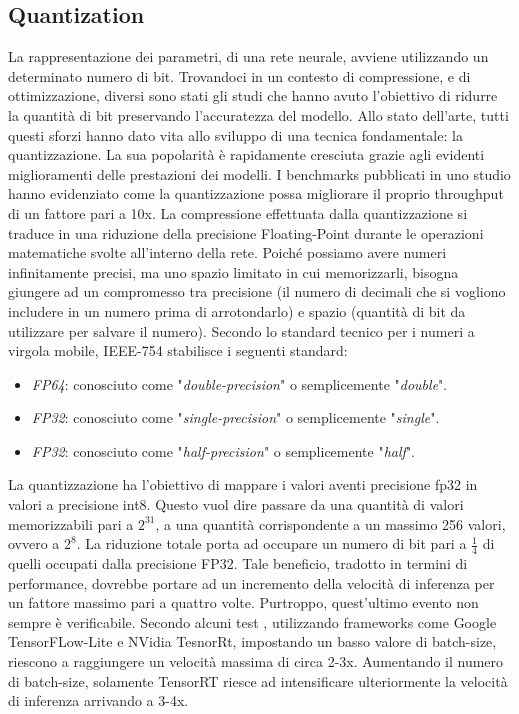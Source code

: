 \subsection{Quantization}
La rappresentazione dei parametri, di una rete neurale, avviene utilizzando un determinato numero di bit. Trovandoci in un contesto di compressione, e di ottimizzazione, diversi sono stati gli studi che hanno avuto l'obiettivo di ridurre la quantità di bit preservando l'accuratezza del modello. Allo stato dell'arte, tutti questi sforzi hanno dato vita allo sviluppo di una tecnica fondamentale: la quantizzazione. La sua popolarità è rapidamente cresciuta grazie agli evidenti miglioramenti delle prestazioni dei modelli. I benchmarks pubblicati in uno studio \cite{quantization_speed} hanno evidenziato come la quantizzazione possa migliorare il proprio throughput di un fattore pari a 10x.
La compressione effettuata dalla quantizzazione si traduce in una riduzione della precisione Floating-Point durante le operazioni matematiche svolte all'interno della rete. 
Poiché possiamo avere numeri infinitamente precisi, ma uno spazio limitato in cui memorizzarli, bisogna giungere ad un compromesso tra precisione (il numero di decimali che si vogliono includere in un numero prima di arrotondarlo) e spazio (quantità di bit da utilizzare per salvare il numero). Secondo lo standard tecnico per i numeri a virgola mobile, IEEE-754 stabilisce i seguenti standard:
\begin{itemize}
    \item \emph{FP64}: conosciuto come "\emph{double-precision}" o semplicemente "\emph{double}". 
    \item \emph{FP32}: conosciuto come "\emph{single-precision}" o semplicemente "\emph{single}".
    \item \emph{FP32}: conosciuto come "\emph{half-precision}" o semplicemente "\emph{half}".
\end{itemize}
La quantizzazione ha l'obiettivo di mappare i valori aventi precisione fp32 in valori a precisione int8. Questo vuol dire passare da una quantità di valori memorizzabili pari a $2^{31}$, a una quantità  corrispondente a un massimo 256 valori, ovvero a $2^8$.
La riduzione totale porta ad occupare un numero di bit pari a $\frac{1}{4}$ di quelli occupati dalla precisione FP32.
Tale beneficio, tradotto in termini di performance, dovrebbe portare ad un incremento della velocità di inferenza per un fattore massimo pari a quattro volte. Purtroppo, quest'ultimo evento non sempre è verificabile. Secondo alcuni test \cite{LIANG2021370}, utilizzando frameworks come Google TensorFLow-Lite e NVidia TesnorRt, impostando un basso valore di batch-size, riescono a raggiungere un velocità massima di circa 2-3x. Aumentando il numero di batch-size, solamente TensorRT riesce ad intensificare ulteriormente la velocità di inferenza arrivando a 3-4x.
